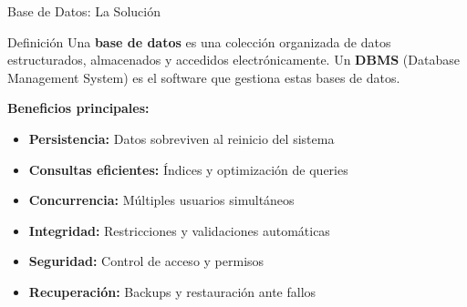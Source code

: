 \documentclass[aspectratio=169]{beamer}
\begin{document}
\begin{frame}{Base de Datos: La Solución}
    \begin{block}{Definición}
        Una \textbf{base de datos} es una colección organizada de datos estructurados, almacenados y accedidos electrónicamente. Un \textbf{DBMS} (Database Management System) es el software que gestiona estas bases de datos.
    \end{block}
    
    \vspace{0.3cm}
    \textbf{Beneficios principales:}
    \begin{itemize}
        \item \textbf{Persistencia:} Datos sobreviven al reinicio del sistema
        \item \textbf{Consultas eficientes:} Índices y optimización de queries
        \item \textbf{Concurrencia:} Múltiples usuarios simultáneos
        \item \textbf{Integridad:} Restricciones y validaciones automáticas
        \item \textbf{Seguridad:} Control de acceso y permisos
        \item \textbf{Recuperación:} Backups y restauración ante fallos
    \end{itemize}
\end{frame}
\end{document}
